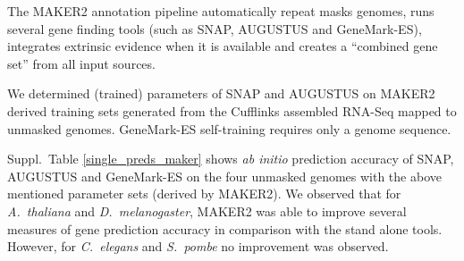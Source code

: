\documentclass[a4paper,10pt]{report}
\begin{document}
\vspace{0.2cm}


The MAKER2 annotation pipeline automatically repeat masks genomes, runs several gene finding tools (such as SNAP, AUGUSTUS and GeneMark-ES), integrates extrinsic evidence when it is available and creates a ``combined gene set'' from all input sources. 

We determined (trained) parameters of SNAP and AUGUSTUS on MAKER2 derived training sets generated from the Cufflinks assembled RNA-Seq mapped to unmasked genomes. GeneMark-ES self-training requires only a genome sequence.

Suppl.~Table \ref{single_preds_maker} shows \textit{ab initio} prediction accuracy of SNAP, AUGUSTUS and GeneMark-ES on the four unmasked genomes with the above mentioned parameter sets (derived by MAKER2). We observed that for \textit{A.~thaliana} and \textit{D.~melanogaster}, MAKER2 was able to improve several measures of gene prediction accuracy in comparison with the stand alone tools. However, for \textit{C.~elegans} and \textit{S.~pombe} no improvement was observed. 
\end{document}

